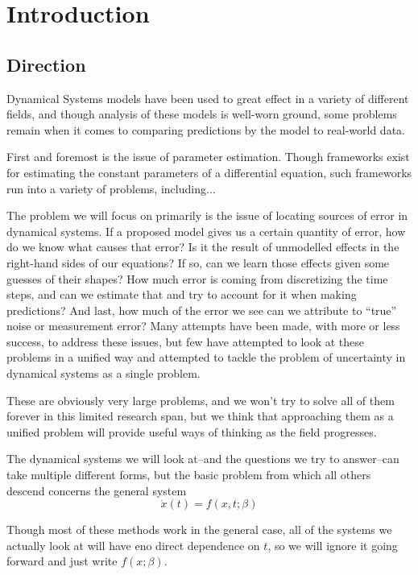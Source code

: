 \documentclass[12pt]{article}
\begin{document}
\section{Introduction}

\subsection{Direction}

Dynamical Systems models have been used to great effect in a variety of different fields, and though analysis of these models is well-worn ground, some problems remain when it comes to comparing predictions by the model to real-world data.


First and foremost is the issue of parameter estimation. Though frameworks exist for estimating the constant parameters of a differential equation, such frameworks run into a variety of problems, including$\ldots$


The problem we will focus on primarily is the issue of locating sources of error in dynamical systems. If a proposed model gives us a certain quantity of error, how do we know what causes that error? Is it the result of unmodelled effects in the right-hand sides of our equations? If so, can we learn those effects given some guesses of their shapes? How much error is coming from discretizing the time steps, and can we estimate that and try to account for it when making predictions? And last, how much of the error we see can we attribute to ``true'' noise or measurement error? Many attempts have been made, with more or less success, to address these issues, but few have attempted to look at these problems in a unified way and attempted to tackle the problem of uncertainty in dynamical systems as a single problem.


These are obviously very large problems, and we won't try to solve all of them forever in this limited research span, but we think that approaching them as a unified problem will provide useful ways of thinking as the field progresses.


The dynamical systems we will look at\---and the questions we try to answer\---can take multiple different forms, but the basic problem from which all others descend concerns the general system $$\dot{x}(t) = f(x,t;\beta)$$

Though most of these methods work in the general case, all of the systems we actually look at will have eno direct dependence on $t$, so we will ignore it going forward and just write $f(x;\beta)$.
\end{document}
